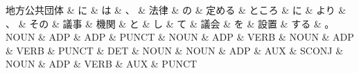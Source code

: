 \documentclass[tikz,border=5pt]{standalone}
\begin{document}
\normalsize
\begin{dependency}[edge unit distance=12.0pt]
    \begin{deptext}[column sep=1em]
        地方公共団体 \& に \& は \& 、 \& 法律 \& の \& 定める \& ところ \& に \& より \& 、 \& その \& 議事 \& 機関 \& と \& し \& て \& 議会 \& を \& 設置 \& する \& 。\\
        NOUN \& ADP \& ADP \& PUNCT \& NOUN \& ADP \& VERB \& NOUN \& ADP \& VERB \& PUNCT \& DET \& NOUN \& NOUN \& ADP \& AUX \& SCONJ \& NOUN \& ADP \& VERB \& AUX \& PUNCT\\
    \end{deptext}
\end{dependency}
\end{document}
